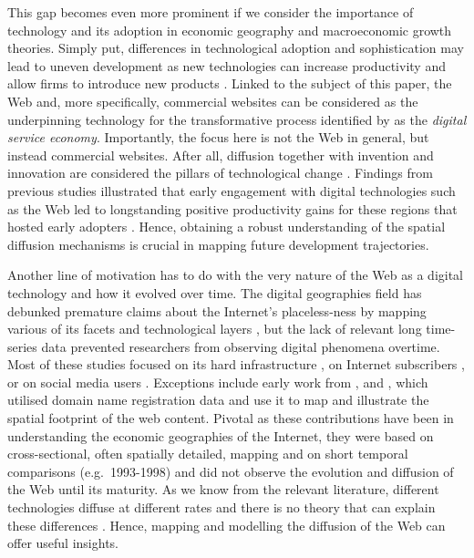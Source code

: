 \documentclass[
  authoryear,
  preprint,
  3p]{elsarticle}
\begin{document}
This gap becomes even more prominent if we consider the importance of
technology and its adoption in economic geography and macroeconomic
growth theories. Simply put, differences in technological adoption and
sophistication may lead to uneven development as new technologies can
increase productivity and allow firms to introduce new products
\citep{solow1957technical, aghion1990model, kemeny2011international}.
Linked to the subject of this paper, the Web and, more specifically,
commercial websites can be considered as the underpinning technology for
the transformative process identified by \citet{capello2024nexus} as the
\emph{digital service economy}. Importantly, the focus here is not the
Web in general, but instead commercial websites. After all, diffusion
together with invention and innovation are considered the pillars of
technological change \citep{das2022diffusion}. Findings from previous
studies illustrated that early engagement with digital technologies such
as the Web led to longstanding positive productivity gains for these
regions that hosted early adopters \citep{tranosuk}. Hence, obtaining a
robust understanding of the spatial diffusion mechanisms is crucial in
mapping future development trajectories.

Another line of motivation has to do with the very nature of the Web as
a digital technology and how it evolved over time. The digital
geographies field has debunked premature claims about the Internet's
placeless-ness by mapping various of its facets and technological layers
\citep{tranos2013death}, but the lack of relevant long time-series data
prevented researchers from observing digital phenomena overtime. Most of
these studies focused on its hard infrastructure
\citep[e.g.][]{malecki2002economic, moss2000internet}, on Internet
subscribers \citep[e.g.][]{blank2018local}, or on social media users
\citep[e.g.][]{crampton2013beyond}. Exceptions include early work from
\citet{zook2000web}, \citet{zook2001old} and \citet{moss1997tracking},
which utilised domain name registration data and use it to map and
illustrate the spatial footprint of the web content. Pivotal as these
contributions have been in understanding the economic geographies of the
Internet, they were based on cross-sectional, often spatially detailed,
mapping and on short temporal comparisons (e.g.~1993-1998) and did not
observe the evolution and diffusion of the Web until its maturity. As we
know from the relevant literature, different technologies diffuse at
different rates and there is no theory that can explain these
differences \citep{leibowicz2016representing}. Hence, mapping and
modelling the diffusion of the Web can offer useful insights.
\end{document}

